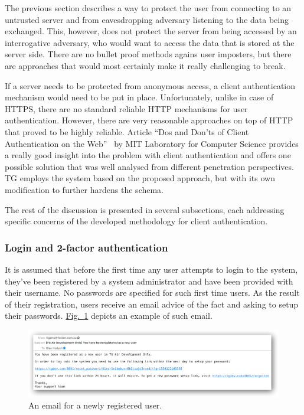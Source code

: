\documentclass[a4paper,12pt,oneside,openright]{memoir}
\begin{document}
	The previous section describes a way to protect the user from connecting to an untrusted server and from eavesdropping adversary listening to the data being exchanged.
	This, however, does not protect the server from being accessed by an interrogative adversary, who would want to access the data that is stored at the server side.
	There are no bullet proof methods agains user imposters, but there are approaches that would most certainly make it really challenging to break.

	If a server needs to be protected from anonymous access, a client authentication mechanism would need to be put in place.
	Unfortunately, unlike in case of HTTPS, there are no standard reliable HTTP mechanisms for user authentication.
	However, there are very reasonable approaches on top of HTTP that proved to be highly reliable.
	Article ``Dos and Don’ts of Client Authentication on the Web''~\cite{MIT} by MIT Laboratory for Computer Science provides a really good insight into the problem with client authentication and offers one possible solution that was well analysed from different penetration perspectives.
	TG employs the system based on the proposed approach, but with its own modification to further hardens the schema.

	The rest of the discussion is presented in several subsections, each addressing specific concerns of the developed methodology for client authentication.

\subsubsection*{Login and 2-factor authentication}
	It is assumed that before the first time any user attempts to login to the system, they've been registered by a system administrator and have been provided with their username.
	No passwords are specified for such first time users.
	As the result of their registration, users receive an email advice of the fact and asking to setup their passwords.
	\hyperref[sec:02:fig:2]{Fig.~\ref*{sec:02:fig:2}} depicts an example of such email.

	\begin{figure}[h!tbp]
	\centering
	\includegraphics[width=1\linewidth]{images/02-new-user-registration-email.png}
	\caption{An email for a newly registered user.}\label{sec:02:fig:2}
	\end{figure}
\end{document}
